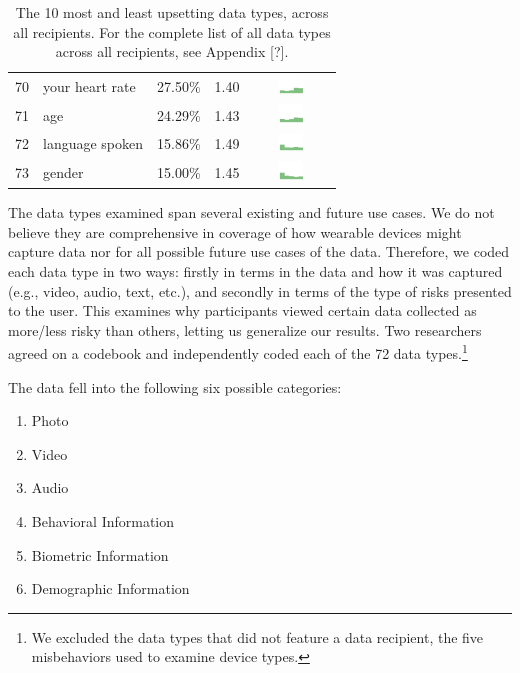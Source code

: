 \begin{table}[t]
\begin{center}
\begin{tabular}{| r | l | r | r |c |}
70 & your heart rate & 27.50\% & 1.40 & \includegraphics[width = 2cm, height = 0.5cm]{tex-inputs/data10/learnedyourheartratecombined} \\
71 & age & 24.29\% & 1.43 & \includegraphics[width = 2cm, height = 0.5cm]{tex-inputs/data10/learnedyouragecombined}\\
72 & language spoken & 15.86\% & 1.49 & \includegraphics[width = 2cm, height = 0.5cm]{tex-inputs/data10/learnedthelanguageyouwerespeakingcombined}\\
73 & gender & 15.00\% & 1.45 & \includegraphics[width = 2cm, height = 0.5cm]{tex-inputs/data10/learnedyourgendercombined}\\ 
\hline
\end{tabular}
\caption{The 10 most and least upsetting data types, across all recipients. For the complete list of all data types across all recipients, see Appendix [?].}
\label{top10-table}
\end{center}
\end{table}

The data types examined span several existing and future use cases. We do not believe they are comprehensive in coverage of how wearable devices might capture data nor for all possible future use cases of the data. Therefore, we coded each data type in two ways: firstly in terms in the data and how it was captured (e.g., video, audio, text, etc.), and  secondly in terms of the type of risks presented to the user. This examines why participants viewed certain data collected as more/less risky than others, letting us  generalize our results. Two researchers agreed on a codebook and independently coded each of the 72 data types.\footnote{We excluded the data types that did not feature a data recipient, the five misbehaviors used to examine device types.}

The data fell into the following six possible categories:
\begin{enumerate}[topsep=0pt,itemsep=-1ex,partopsep=1ex,parsep=1ex]
\item Photo
\item Video
\item Audio
\item Behavioral Information
\item Biometric Information
\item Demographic Information
\end{enumerate}

